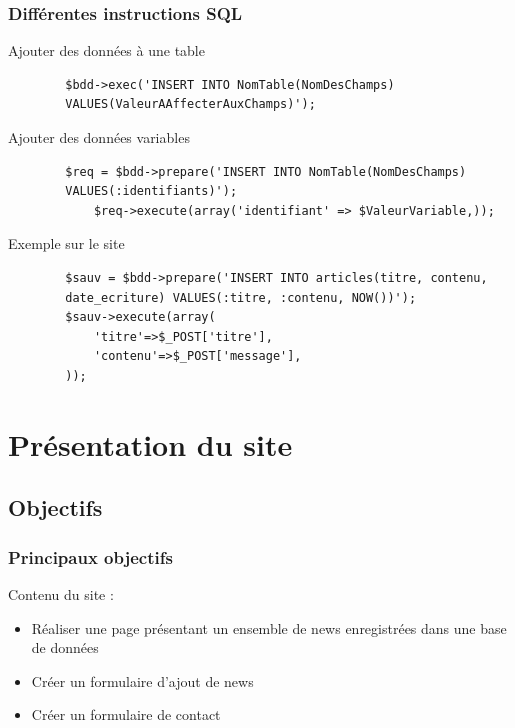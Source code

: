 \documentclass[handout]{beamer}
\begin{document}
\begin{frame}[fragile]
	\frametitle{Différentes instructions SQL}

	\begin{block}{Ajouter des données à une table}
	\begin{verbatim}
		$bdd->exec('INSERT INTO NomTable(NomDesChamps) 
		VALUES(ValeurAAffecterAuxChamps)');
	\end{verbatim}
	\end{block}

	\begin{block}{Ajouter des données variables}
	\begin{verbatim}
		$req = $bdd->prepare('INSERT INTO NomTable(NomDesChamps) 
		VALUES(:identifiants)');
			$req->execute(array('identifiant' => $ValeurVariable,));
	\end{verbatim}
	\end{block}

	\begin{exampleblock}{Exemple sur le site}
		\begin{verbatim}
		$sauv = $bdd->prepare('INSERT INTO articles(titre, contenu,
		date_ecriture) VALUES(:titre, :contenu, NOW())');
		$sauv->execute(array(
			'titre'=>$_POST['titre'],
			'contenu'=>$_POST['message'],
		));
	\end{verbatim}
	\end{exampleblock}
\end{frame}


\section{Présentation du site}
\subsection{Objectifs}
 
\begin{frame}
	\frametitle{Principaux objectifs}
	\begin{block}{Contenu du site :}
	\begin{itemize}
		\item Réaliser une page présentant un ensemble de news enregistrées dans une base de données
		\item Créer un formulaire d'ajout de news
		\item Créer un formulaire de contact
	\end{itemize}
	\end{block}
\end{frame}
\end{document}

